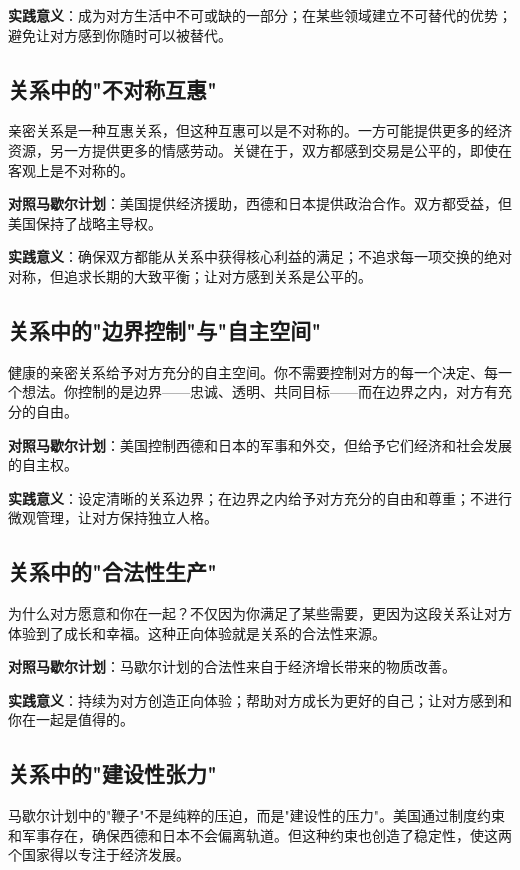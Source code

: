 \documentclass[12pt,a4paper]{article}
\begin{document}
\textbf{实践意义}：成为对方生活中不可或缺的一部分；在某些领域建立不可替代的优势；避免让对方感到你随时可以被替代。

\subsection{关系中的"不对称互惠"}

亲密关系是一种互惠关系，但这种互惠可以是不对称的。一方可能提供更多的经济资源，另一方提供更多的情感劳动。关键在于，双方都感到交易是公平的，即使在客观上是不对称的。

\textbf{对照马歇尔计划}：美国提供经济援助，西德和日本提供政治合作。双方都受益，但美国保持了战略主导权。

\textbf{实践意义}：确保双方都能从关系中获得核心利益的满足；不追求每一项交换的绝对对称，但追求长期的大致平衡；让对方感到关系是公平的。

\subsection{关系中的"边界控制"与"自主空间"}

健康的亲密关系给予对方充分的自主空间。你不需要控制对方的每一个决定、每一个想法。你控制的是边界——忠诚、透明、共同目标——而在边界之内，对方有充分的自由。

\textbf{对照马歇尔计划}：美国控制西德和日本的军事和外交，但给予它们经济和社会发展的自主权。

\textbf{实践意义}：设定清晰的关系边界；在边界之内给予对方充分的自由和尊重；不进行微观管理，让对方保持独立人格。

\subsection{关系中的"合法性生产"}

为什么对方愿意和你在一起？不仅因为你满足了某些需要，更因为这段关系让对方体验到了成长和幸福。这种正向体验就是关系的合法性来源。

\textbf{对照马歇尔计划}：马歇尔计划的合法性来自于经济增长带来的物质改善。

\textbf{实践意义}：持续为对方创造正向体验；帮助对方成长为更好的自己；让对方感到和你在一起是值得的。

\subsection{关系中的"建设性张力"}

马歇尔计划中的"鞭子"不是纯粹的压迫，而是"建设性的压力"。美国通过制度约束和军事存在，确保西德和日本不会偏离轨道。但这种约束也创造了稳定性，使这两个国家得以专注于经济发展。
\end{document}
